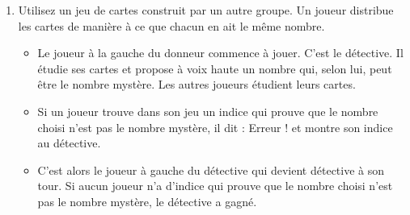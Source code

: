 \begin{TP}
\begin{enumerate}
\item Utilisez un jeu de cartes construit par un autre groupe. Un joueur distribue les cartes de manière à ce que chacun en ait le même nombre.
\begin{itemize}
    \item Le joueur à la gauche du donneur commence à jouer. C'est le détective. Il étudie ses cartes et propose à voix haute un nombre qui, selon lui, peut être le nombre mystère. Les autres joueurs étudient leurs cartes.
    \item Si un joueur trouve dans son jeu un indice qui prouve que le nombre choisi n'est pas le nombre mystère, il dit : \og Erreur ! \fg et montre son indice au détective.
    \item C'est alors le joueur à gauche du détective qui devient détective à son tour. Si aucun joueur n'a d'indice qui prouve que le nombre choisi n'est pas le nombre mystère, le détective a gagné.
\end{itemize}
\end{enumerate}
\end{TP}

